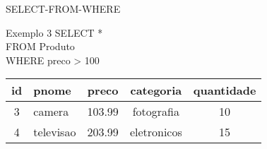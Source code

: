 \documentclass[aspectratio=169]{beamer}
\begin{document}
			\begin{frame}[fragile]{SELECT-FROM-WHERE}
				\begin{block}{Exemplo 3}
					{\ttfamily
						SELECT *\\
						FROM Produto\\
						WHERE preco > 100
					}
				\end{block}
				\begin{table}
						\begin{tabular}{|c|l|c|c|c|}
							\toprule
							\textbf{id} & \textbf{pnome} & \textbf{preco} & \textbf{categoria} & \textbf{quantidade} \\ \midrule
							     3      & camera         &     103.99     &     fotografia     &         10          \\ \midrule
							     4      & televisao      &     203.99     &    eletronicos     &         15          \\ \bottomrule
						\end{tabular}
				\end{table}
			\end{frame}
	
\end{document}
